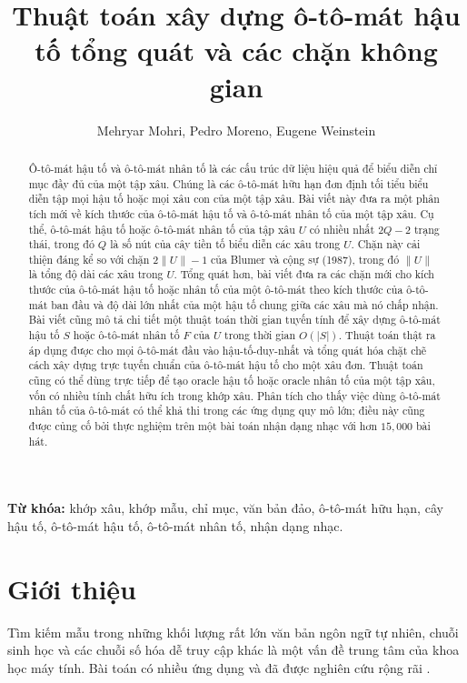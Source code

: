 \documentclass[11pt]{article}
\title{Thuật toán xây dựng ô-tô-mát hậu tố tổng quát và các chặn không gian}
\author{Mehryar Mohri, Pedro Moreno, Eugene Weinstein}
\date{}
\begin{document}
\maketitle


\begin{abstract}
Ô-tô-mát hậu tố và ô-tô-mát nhân tố là các cấu trúc dữ liệu hiệu quả để biểu
diễn chỉ mục đầy đủ của một tập xâu. Chúng là các ô-tô-mát hữu hạn đơn định
tối tiểu biểu diễn tập mọi hậu tố hoặc mọi xâu con của một tập xâu. Bài viết
này đưa ra một phân tích mới về kích thước của ô-tô-mát hậu tố và ô-tô-mát
nhân tố của một tập xâu. Cụ thể, ô-tô-mát hậu tố hoặc ô-tô-mát nhân tố của
tập xâu $U$ có nhiều nhất $2Q-2$ trạng thái, trong đó $Q$ là số nút của cây
tiền tố biểu diễn các xâu trong $U$. Chặn này cải thiện đáng kể so với chặn
$2\|U\|-1$ của Blumer và cộng sự (1987), trong đó $\|U\|$ là tổng độ dài các
xâu trong $U$. Tổng quát hơn, bài viết đưa ra các chặn mới cho kích thước của
ô-tô-mát hậu tố hoặc nhân tố của một ô-tô-mát theo kích thước của ô-tô-mát
ban đầu và độ dài lớn nhất của một hậu tố chung giữa các xâu mà nó chấp nhận.
Bài viết cũng mô tả chi tiết một thuật toán thời gian tuyến tính để xây dựng
ô-tô-mát hậu tố $S$ hoặc ô-tô-mát nhân tố $F$ của $U$ trong thời gian
$O(|S|)$. Thuật toán thật ra áp dụng được cho mọi ô-tô-mát đầu vào
hậu-tố-duy-nhất và tổng quát hóa chặt chẽ cách xây dựng trực tuyến chuẩn của
ô-tô-mát hậu tố cho một xâu đơn. Thuật toán cũng có thể dùng trực tiếp để tạo
oracle hậu tố hoặc oracle nhân tố của một tập xâu, vốn có nhiều tính chất hữu
ích trong khớp xâu. Phân tích cho thấy việc dùng ô-tô-mát nhân tố của ô-tô-mát
có thể khả thi trong các ứng dụng quy mô lớn; điều này cũng được củng cố bởi
thực nghiệm trên một bài toán nhận dạng nhạc với hơn $15{,}000$ bài hát.
\end{abstract}

\noindent\textbf{Từ khóa:} khớp xâu, khớp mẫu, chỉ mục, văn bản đảo,
ô-tô-mát hữu hạn, cây hậu tố, ô-tô-mát hậu tố, ô-tô-mát nhân tố, nhận dạng
nhạc.

\section{Giới thiệu}

Tìm kiếm mẫu trong những khối lượng rất lớn văn bản ngôn ngữ tự nhiên, chuỗi
sinh học và các chuỗi số hóa dễ truy cập khác là một vấn đề trung tâm của khoa
học máy tính. Bài toán có nhiều ứng dụng và đã được nghiên cứu rộng rãi
\cite{gusfield,crochemore-rytter}.
\end{document}
